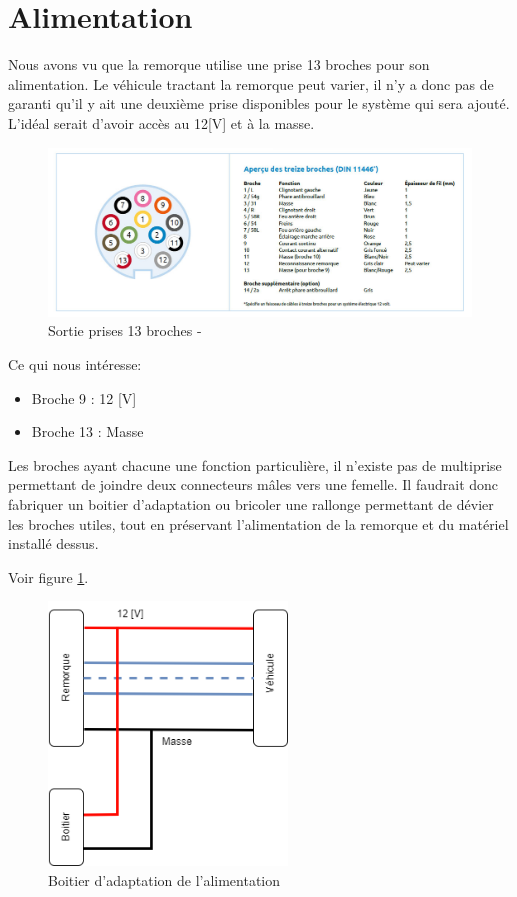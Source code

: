 \section{Alimentation}
Nous avons vu que la remorque utilise une prise 13 broches pour son alimentation. Le véhicule tractant la remorque peut varier, il n'y a donc pas de
garanti qu'il y ait une deuxième prise disponibles pour le système qui sera ajouté. L'idéal serait d'avoir accès au 12[V] et à la masse.
\begin{figure}[H]
    \centering
    \includegraphics[width=14cm]{assets/figures/broches.jpg}
    \caption{Sortie prises 13 broches - \cite{prise}}
\end{figure}
Ce qui nous intéresse:
\begin{itemize}
    \item Broche 9  : 12 [V]
    \item Broche 13 : Masse
\end{itemize}
Les broches ayant chacune une fonction particulière, il n'existe pas de multiprise permettant de joindre deux connecteurs mâles vers une femelle.
Il faudrait donc fabriquer un boitier d'adaptation ou bricoler une rallonge permettant de dévier les broches utiles, tout en préservant l'alimentation de la remorque et du matériel installé dessus.


Voir figure \ref{alim}.
\begin{figure}[h]
    \centering
    \includegraphics[height=7cm]{assets/figures/alimentation.png}
    \caption{Boitier d'adaptation de l'alimentation \label{alim}}
\end{figure}
\newpage


